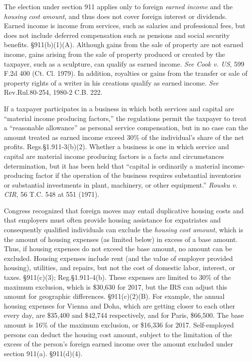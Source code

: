 The election under section 911 applies only to foreign \emph{earned income} and the \emph{housing cost amount}, and thus does not cover foreign interest or dividends.  Earned income is income from services, such as salaries and professional fees, but does not include deferred compensation such as pensions and social security benefits.  \S911(b)(1)(A).  Although gains from the sale of property are not earned income, gains arising from the sale of property produced or created by the taxpayer, such as a sculpture, can qualify as earned income.  \emph{See Cook v. US}, 599 F.2d 400 (Ct. Cl. 1979).  In addition, royalties or gains from the transfer or sale of property rights of a writer in his creations qualify as earned income.  \emph{See} Rev.\@ Rul.\@ 80-254, 1980-2 C.B. 222.

 If a taxpayer participates in a business in which both services and capital are ``material income producing factors,'' the regulations permit the taxpayer to treat a ``reasonable allowance'' as personal service compensation, but in no case can the amount treated as earned income exceed 30\% of the individual's share of the net profits.  Regs.\@ \S1.911-3(b)(2).  Whether a business is one in which service and capital are material income producing factors is a facts and circumstances determination, but it has been held that ``capital is ordinarily a material income-producing factor if the operation of the business requires substantial inventories or substantial investments in plant, machinery, or other equipment.''  \emph{Rousku v. CIR}, 56 T.C. 548 at 551 (1971).
 
 Congress recognized that foreign moves may entail duplicative housing costs and that employers must often provide housing assistance for expatriates and consequently qualified individuals can exclude the \emph{housing cost amount}, which is the amount of housing expenses (as limited below) in excess of a base amount.  Thus, if housing expenses do not exceed the base amount, no amount can be excluded.  Housing expenses include rent (and the value of employer provided housing), utilities, and repairs, but not the cost of domestic labor, interest, or taxes.  \S911(c)(3); Reg.\@ \S1.911-4(b).  These expenses are limited to 30\% of the maximum exclusion, which is \$30,630 for 2017, but the IRS can adjust this amount for geographic differences.  \S911(c)(2)(B).  For example, the annual housing expenses for Vienna and Doha, which are getting closer to each other every day, are \$35,400 and \$42,744 respectively, and for Paris, \$66,500.  The base amount is 16\% of the maximum exclusion, or \$16,336 for 2017.  Self-employed persons can deduct the housing cost amount, subject to the limitation of the excess of the person's foreign earned income over the amount excluded under section 911(a).  \S911(d)(4).
 
